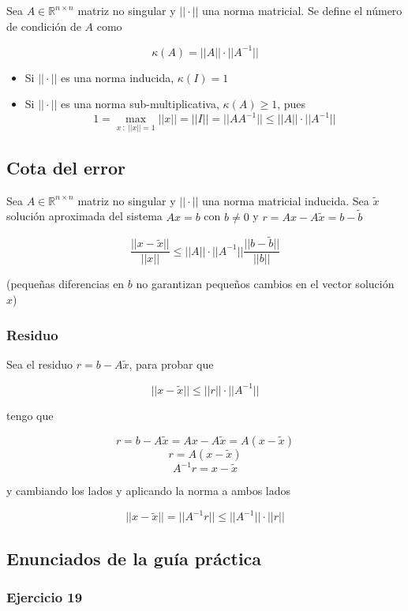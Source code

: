 Sea $A \in \mathbb{R}^{n \times n}$ matriz no singular y $||\cdot||$ una norma matricial. 
Se define el número de condición de $A$ como

\[\kappa(A) = ||A||\cdot||A^{-1}||\]

\begin{itemize}
    \item Si $||\cdot||$ es una norma inducida, $\kappa(I) = 1$
    \item Si $||\cdot||$ es una norma sub-multiplicativa, $\kappa(A) \geq 1$, pues
    \[1 = \underset{x~:~||x||=1}{\max}||x|| = ||I|| = ||AA^{-1}|| \leq ||A||\cdot||A^{-1}||\]
\end{itemize}

\subsection{Cota del error}\label{subsec:cota_de_error}

Sea $A \in \mathbb{R}^{n \times n}$ matriz no singular y $||\cdot||$ una norma matricial inducida. 
Sea $\tilde x$ solución aproximada del sistema $Ax = b$ con $b \neq 0$ y $r = Ax - A\tilde x = b - \tilde b$

\[\frac{||x - \tilde x||}{||x||} \leq ||A||\cdot||A^{-1}||\frac{||b - \tilde b||}{||b||}\]

(pequeñas diferencias en $b$ no garantizan pequeños cambios en el vector solución $x$)

\subsubsection{Residuo}

Sea el residuo $r = b - A\tilde x$, para probar que

\[||x- \tilde x|| \leq ||r||\cdot||A^{-1}||\]

tengo que 

\[r = b - A\tilde x = Ax - A\tilde x = A(x-\tilde x)\]
\[r = A(x-\tilde x)\]
\[A^{-1}r = x - \tilde x\]

y cambiando los lados y aplicando la norma a ambos lados

\[||x - \tilde x|| = ||A^{-1}r|| \leq ||A^{-1}||\cdot||r||\]

\subsection{Enunciados de la guía práctica}\label{subsec:enunciados_guia_2_normas}

\subsubsection{Ejercicio 19}\label{subsubsec:guia_2_ej_19}

